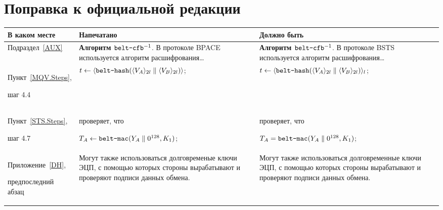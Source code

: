 \clearpage
\chapter*{\mbox{}\hfill Поправка к официальной редакции\hfill\mbox{}}

\mbox{}

\begin{center}
\begin{tabular}{|p{2.9cm}|p{6.3cm}|p{6.3cm}|}
\hline
В каком месте & Напечатано & Должно быть\\
\hline
\hline
Подраздел~\ref{AUX}
&
{\bf Алгоритм $\texttt{belt-cfb}^{-1}$}.
В протоколе BPACE используется алгоритм расшифрования\ldots
&
{\bf Алгоритм $\texttt{belt-cfb}^{-1}$}.
В протоколе BSTS используется алгоритм расшифрования\ldots 
\\
\hline
Пункт~\ref{MQV.Steps},\par
шаг 4.4
&
$t\leftarrow\langle\texttt{belt-hash}
(\langle V_A\rangle_{2l}\parallel\langle V_B\rangle_{2l})\rangle$;
&
$t\leftarrow\langle\texttt{belt-hash}
(\langle V_A\rangle_{2l}\parallel\langle V_B\rangle_{2l})\rangle_l$;
\\
\hline
Пункт~\ref{STS.Steps},\par
шаг 4.7
&
проверяет, что\par
$T_A\leftarrow\texttt{belt-mac}(Y_A\parallel 0^{128}, K_1)$;
&
проверяет, что\par
$T_A=\texttt{belt-mac}(Y_A\parallel 0^{128}, K_1)$;
\\
\hline
Приложение~\ref{DH},\par
предпоследний абзац
&
Могут также использоваться долговременые 
ключи ЭЦП, с помощью которых стороны вырабатывают и проверяют
подписи данных обмена.
&
Могут также использоваться долговременные 
ключи ЭЦП, с помощью которых стороны вырабатывают и проверяют
подписи данных обмена.
\\
\hline
\end{tabular}
\end{center}